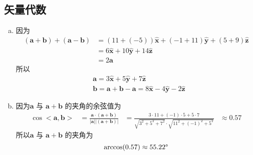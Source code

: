 \subsection{矢量代数}
\begin{enumerate}[(a)]
	\item 因为
	\[
	\begin{aligned}
	(\bm{a} + \bm{b}) + (\bm{a} - \bm{b})
	&= (11+(-5))\bm{\hat{x}} + (-1 + 11)\bm{\hat{y}} + (5+9)\bm{\hat{z}} \\
	&= 6 \bm{\hat{x}} + 10\bm{\hat{y}} + 14\bm{\hat{z}} \\
	&= 2\bm{a}
	\end{aligned}
	\]
	所以
	\[
	\begin{aligned}
	&\bm{a} = 3 \bm{\hat{x}} + 5\bm{\hat{y}} + 7\bm{\hat{z}}  \\
	&\bm{b} = \bm{a} + \bm{b} - \bm{a} = 8 \bm{\hat{x}} - 4\bm{\hat{y}} - 2\bm{\hat{z}}
	\end{aligned}
	\]
	\item
	因为$ \bm{a} $ 与 $ \bm{a} + \bm{b} $ 的夹角的余弦值为
	\[
	\begin{aligned}
	\cos<\bm{a},\bm{b}> &= \frac{\bm{a} \cdot (\bm{a} + \bm{b})}{|\bm{a}||(\bm{a} + \bm{b})|}
						    &=\frac{3 \cdot 11 + (-1) \cdot 5 + 5 \cdot 7}{\sqrt{3^2+5^2+7^2} \cdot \sqrt{11^2+(-1)^2+5^2}} & \approx 0.57
	\end{aligned}
	\]
	所以$ \bm{a} $ 与 $ \bm{a} + \bm{b} $ 的夹角为
	\[
	\arccos(0.57) \approx 55.22\degree
	\]
\end{enumerate}
